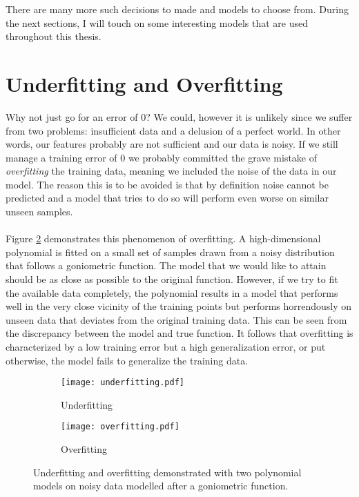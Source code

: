 There are many more such decisions to made
and models to choose from.
During the next sections,
I will touch on some interesting
models that are used throughout this thesis.

\section{Underfitting and Overfitting}
Why not just go for an error of $0$?
We could, however it is unlikely since we suffer from two problems:
insufficient data and a delusion of a perfect world.
In other words, our features probably are not sufficient
and our data is noisy.
If we still manage a training error of $0$
we probably committed the grave mistake of
\textit{overfitting} the training data,
meaning we included the noise of the data in our model.
The reason this is to be avoided is that by definition
noise cannot be predicted and a model that tries
to do so will perform even worse on similar unseen samples.

\paragraph{}
Figure
\ref{fig:overfitting}
demonstrates this phenomenon of overfitting.
A high-dimensional polynomial is fitted on
a small set of samples drawn from a noisy
distribution that follows a goniometric function.
The model that we would like to attain
should be as close as possible to the original function.
However, if we try to fit the available data completely,
the polynomial results in a model that performs
well in the very close vicinity of the training points
but performs horrendously on unseen data
that deviates from the original training data.
This can be seen from the discrepancy
between the model and true function.
It follows that overfitting is characterized by
a low training error but a high generalization error,
or put otherwise,
the model fails to generalize the training data.

\begin{figure}[h]
\center
\begin{subfigure}{.49\textwidth}
  \centering
  \texttt{[image: underfitting.pdf]}
  \caption{Underfitting}
  \label{fig:underfitting}
\end{subfigure}
\begin{subfigure}{.49\textwidth}
  \centering
  \texttt{[image: overfitting.pdf]}
  \caption{Overfitting}
  \label{fig:overfitting}
\end{subfigure}

\label{fig:fitting}
\caption[Underfitting and Overfitting]{
Underfitting and overfitting
demonstrated with two polynomial
models on noisy data modelled
after a goniometric function.
}
\end{figure}


